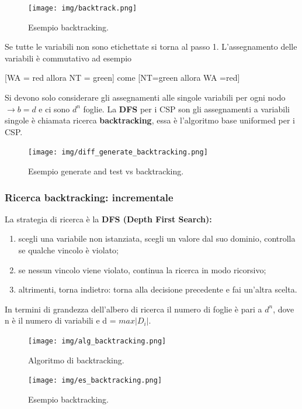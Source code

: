 \begin{figure}[H]
	\centering
    \texttt{[image: img/backtrack.png]}
	\caption{Esempio backtracking.}\label{fig:es_backtracking}
\end{figure}
\noindent Se tutte le variabili non sono etichettate si torna al passo 1. 
 L'assegnamento delle variabili è commutativo ad esempio 
\begin{center}
  [WA = red allora NT = green] come [NT=green allora WA =red]  
\end{center}

\noindent Si devono solo considerare gli assegnamenti alle singole variabili per ogni nodo $\longrightarrow b = d $ e ci sono $d^n$ foglie.
La \textbf{DFS} per i CSP son gli assegnamenti a variabili singole è chiamata ricerca \textbf{backtracking}, essa è l'algoritmo base uniformed per i CSP.

\begin{figure}[H]
	\centering
    \texttt{[image: img/diff\_generate\_backtracking.png]}
	\caption{Esempio generate and test vs backtracking.}\label{fig:diff_generate_backtracking}
\end{figure}

\subsubsection{Ricerca backtracking: incrementale}
La strategia di ricerca è la\textbf{ DFS (Depth First Search):}
\begin{enumerate}
    \item scegli una variabile non istanziata, scegli un valore dal suo dominio, controlla se qualche vincolo è violato;
    \item se nessun vincolo viene violato, continua la ricerca in modo ricorsivo;
    \item altrimenti, torna indietro: torna alla decisione precedente e fai un'altra scelta.
\end{enumerate}
In termini di grandezza dell'albero di ricerca il numero di foglie è pari a $d^n$, dove n è il numero di variabili e d = $max|D_i|$.
\begin{figure}[H]
	\centering
    \texttt{[image: img/alg\_backtracking.png]}
	\caption{Algoritmo di backtracking.}\label{fig:alg_backtracking}
\end{figure}

\begin{figure}[H]
	\centering
    \texttt{[image: img/es\_backtracking.png]}
	\caption{Esempio backtracking.}\label{fig:es_backtracking}
\end{figure}

